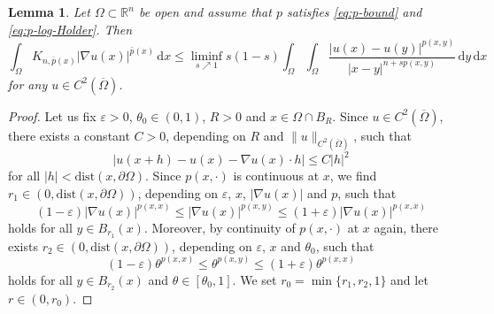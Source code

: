 \documentclass[10pt,a4paper]{amsart}
\newtheorem{lemma}{Lemma}
\begin{document}
\begin{lemma} \label{lem:liminf}
Let $\Omega \subset \mathbb{R}^{n}$ be open and assume that $p$ satisfies \eqref{eq:p-bound} and \eqref{eq:p-log-Holder}. Then
\begin{equation} \label{eq:liminf}
\int_{\Omega} K_{n, \bar{p}(x)} |\nabla u(x)|^{\bar{p}(x)} \,\mathrm{d}x \leq \liminf_{s \nearrow 1} s(1-s) \int_{\Omega} \int_{\Omega} \frac{|u(x)-u(y)|^{p(x, y)}}{|x-y|^{n+sp(x, y)}} \,\mathrm{d}y \,\mathrm{d}x
\end{equation}
for any $u \in C^{2}(\overline{\Omega})$.
\end{lemma}

\begin{proof}
Let us fix $\varepsilon > 0$, $\theta_{0} \in (0,1)$, $R > 0$ and $x \in \Omega \cap B_{R}$. Since $u \in C^{2}(\overline{\Omega})$, there exists a constant $C > 0$, depending on $R$ and $\|u\|_{C^{2}(\overline{\Omega})}$, such that
\begin{equation} \label{eq:second-difference}
|u(x+h)-u(x)-\nabla u(x) \cdot h| \leq C |h|^{2}
\end{equation}
for all $|h| < \mathrm{dist}(x, \partial \Omega)$. Since $p(x, \cdot)$ is continuous at $x$, we find $r_{1} \in (0, \mathrm{dist}(x, \partial \Omega))$, depending on $\varepsilon$, $x$, $|\nabla u(x)|$ and $p$, such that
\begin{equation} \label{eq:r1}
(1-\varepsilon) |\nabla u(x)|^{p(x, x)} \leq |\nabla u(x)|^{p(x, y)} \leq (1+\varepsilon) |\nabla u(x)|^{p(x, x)}
\end{equation}
holds for all $y \in B_{r_{1}}(x)$. Moreover, by continuity of $p(x, \cdot)$ at $x$ again, there exists $r_{2} \in (0, \mathrm{dist}(x, \partial \Omega))$, depending on $\varepsilon$, $x$ and $\theta_0$, such that
\begin{equation} \label{eq:r2}
(1-\varepsilon) \theta^{p(x, x)} \leq \theta^{p(x, y)} \leq (1+ \varepsilon) \theta^{p(x, x)}
\end{equation}
holds for all $y \in B_{r_{2}}(x)$ and $\theta \in [\theta_{0}, 1]$. We set $r_{0} = \min\lbrace r_{1}, r_{2}, 1 \rbrace$ and let $r \in (0, r_{0})$.


\end{proof}
\end{document}

